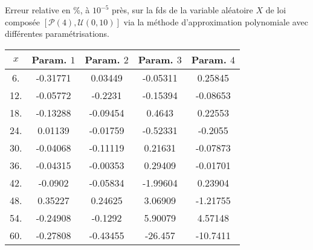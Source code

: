 	\begin{tableth}
		\caption[Erreur relative ($\%$) sur la \gls{fds} d'une loi $\left(\mathcal{P}(4),\mathcal{U}(0,10)\right)$ associée à la méthode d'approximation polynomiale]{Erreur relative en $\%$, à $10^{-5}$ près, sur la \gls{fds} de la variable aléatoire $X$ de loi composée $\left[\mathcal{P}(4),\mathcal{U}(0,10)\right]$ via la méthode d'approximation polynomiale avec différentes paramétrisations.}
			\label{TableRelativeErrorSurvivalDifferentParametrizationCompoundPoissonUniform}
		\begin{tabular}{|c||c|c|c|c|}
\hline
$x$ & Param. $1$ & Param. $2$ &Param. $3$ &Param. $4$ \\
\hline
\hline
 6. & -0.31771 & 0.03449 & -0.05311 & 0.25845 \\
 12. & -0.05772 & -0.2231 & -0.15394 & -0.08653 \\
 18. & -0.13288 & -0.09454 & 0.4643 & 0.22553 \\
 24. & 0.01139 & -0.01759 & -0.52331 & -0.2055 \\
 30. & -0.04068 & -0.11119 & 0.21631 & -0.07873 \\
 36. & -0.04315 & -0.00353 & 0.29409 & -0.01701 \\
 42. & -0.0902 & -0.05834 & -1.99604 & 0.23904 \\
 48. & 0.35227 & 0.24625 & 3.06909 & -1.21755 \\
 54. & -0.24908 & -0.1292 & 5.90079 & 4.57148 \\
 60. & -0.27808 & -0.43455 & -26.457 & -10.7411 \\
\hline
		\end{tabular}
	\end{tableth}

